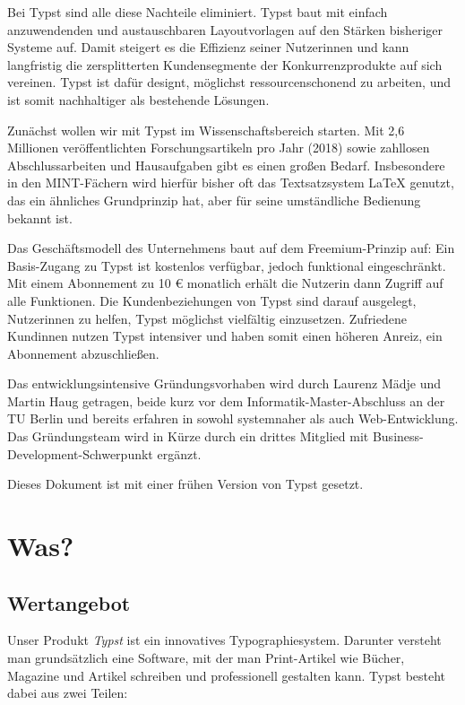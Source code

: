 \documentclass[11pt, a4paper]{article}
\newcommand{\gender}{\raisebox{-.25em}{*}}
\let\oldsection\section
\renewcommand\section{\clearpage\oldsection}
\newcommand{\cited}[1]{\marginsymbol{\textbf{↗} #1}}
\newcommand{\marginsymbol}[1] {\protect\marginsymbolhelper{#1}}
\newcommand{\marginsymbolhelper}[1] {\tabto*{-1cm}\makebox[0cm]{#1}\tabto*{\TabPrevPos}}
\begin{document}
Bei Typst sind alle diese Nachteile eliminiert. Typst baut mit einfach anzuwendenden und austauschbaren Layoutvorlagen auf den Stärken bisheriger Systeme auf. Damit steigert es die Effizienz seiner Nutzer\gender{}innen und kann langfristig die zersplitterten Kundensegmente der Konkurrenzprodukte auf sich vereinen. Typst ist dafür designt, möglichst ressourcenschonend zu arbeiten, und ist somit nachhaltiger als bestehende Lösungen.

Zunächst wollen wir mit Typst im Wissenschaftsbereich starten. Mit \cited{1} 2,6 Millionen veröffentlichten Forschungsartikeln pro Jahr (2018) sowie zahllosen Abschlussarbeiten und Hausaufgaben gibt es einen großen Bedarf. Insbesondere in den MINT-Fächern wird hierfür bisher oft das Textsatzsystem LaTeX genutzt, das ein ähnliches Grundprinzip hat, aber für seine umständliche Bedienung bekannt ist.

Das Geschäftsmodell des Unternehmens baut auf dem Freemium-Prinzip auf: Ein Basis-Zugang zu Typst ist kostenlos verfügbar, jedoch funktional eingeschränkt. Mit einem Abonnement zu 10 € monatlich erhält die\gender{} Nutzer\gender{}in dann Zugriff auf alle Funktionen. Die Kundenbeziehungen von Typst sind darauf ausgelegt, Nutzer\gender{}innen zu helfen, Typst möglichst vielfältig einzusetzen. Zufriedene Kund\gender{}innen nutzen Typst intensiver und haben somit einen höheren Anreiz, ein Abonnement abzuschließen.

Das entwicklungsintensive Gründungsvorhaben wird durch Laurenz Mädje und Martin Haug getragen, beide kurz vor dem Informatik-Master-Abschluss an der TU Berlin und bereits erfahren in sowohl systemnaher als auch Web-Entwicklung. Das Gründungsteam wird in Kürze durch ein drittes Mitglied mit Business-Development-Schwerpunkt ergänzt.

Dieses Dokument ist mit einer frühen Version von Typst gesetzt.


\section*{Was?}
\subsection*{Wertangebot}

Unser Produkt \emph{Typst} ist ein innovatives Typographiesystem. Darunter versteht man grundsätzlich eine Software, mit der man Print-Artikel wie Bücher, Magazine und Artikel schreiben und professionell gestalten kann. Typst besteht dabei aus zwei Teilen:
\end{document}
